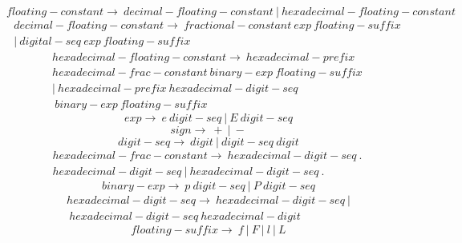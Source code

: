 \documentclass[UTF8]{ctexart}
\begin{document}
\begin{equation}
  floating-constant \rightarrow\ decimal-floating-constant\ |\ hexadecimal-floating-constant
\end{equation}
\begin{equation}
\begin{split}
    decimal-floating-constant \rightarrow\ fractional-constant\ exp\ floating-suffix\ \\ |\ digital-seq\ exp\ floating-suffix
\end{split}
\end{equation}
\begin{equation}
\begin{split}
    hexadecimal-floating-constant \rightarrow\ hexadecimal-prefix\ \\hexadecimal-frac-constant\ binary-exp\ floating-suffix\ \\|\ hexadecimal-prefix\ hexadecimal-digit-seq\\\ binary-exp\ floating-suffix
\end{split}
\end{equation}
\begin{equation}
  exp \rightarrow\ e\ digit-seq\ |\ E\ digit-seq
\end{equation}
\begin{equation}
  sign \rightarrow\ +\ |\ -
\end{equation}
\begin{equation}
  digit-seq \rightarrow\ digit\ |\ digit-seq\ digit
\end{equation}
\begin{equation}
\begin{split}
  hexadecimal-frac-constant \rightarrow\ hexadecimal-digit-seq\ .\ \\hexadecimal-digit-seq\ |\ hexadecimal-digit-seq\ .
\end{split}
\end{equation}
\begin{equation}
  binary-exp \rightarrow\ p\ digit-seq\ |\ P\ digit-seq
\end{equation}
\begin{equation}
\begin{split}
    hexadecimal-digit-seq \rightarrow\ hexadecimal-digit-seq\ |\\\ hexadecimal-digit-seq\ hexadecimal-digit
\end{split}
\end{equation}
\begin{equation}
  floating-suffix \rightarrow\ f\ |\ F\ |\ l\ |\ L
\end{equation}
\end{document}
